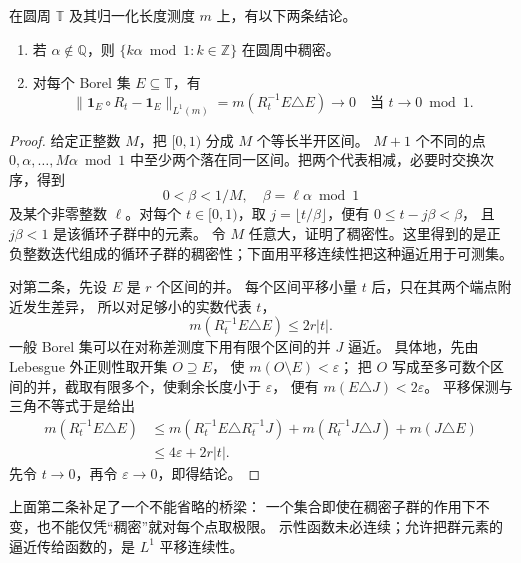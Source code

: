 \begin{lemma}[无理转动的稠密性与集合的平移连续性]
\label{b1:lem:rotation-density-continuity-32}
在圆周 \(\mathbb T\) 及其归一化长度测度 \(m\) 上，有以下两条结论。
\begin{enumerate}
\item\label{b1:item:rotation-dense-group-32}
若 \(\alpha\notin\mathbb Q\)，则
\(\{k\alpha\bmod1:k\in\mathbb Z\}\) 在圆周中稠密。
\item\label{b1:item:rotation-translation-32}
对每个 Borel 集 \(E\subseteq\mathbb T\)，有
\[
 \|\mathbf1_E\circ R_t-\mathbf1_E\|_{L^1(m)}
 =m(R_t^{-1}E\triangle E)\longrightarrow0
 \quad\text{当 }t\to0\bmod1.
\]
\end{enumerate}
\end{lemma}
\begin{proof}
给定正整数 \(M\)，把 \([0,1)\) 分成 \(M\) 个等长半开区间。
\(M+1\) 个不同的点 \(0,\alpha,\ldots,M\alpha\bmod1\)
中至少两个落在同一区间。把两个代表相减，必要时交换次序，得到
\[
 0<\beta<1/M,\quad \beta=\ell\alpha\bmod1
\]
及某个非零整数 \(\ell\)。对每个 \(t\in[0,1)\)，取
\(j=\lfloor t/\beta\rfloor\)，便有 \(0\leq t-j\beta<\beta\)，
且 \(j\beta<1\) 是该循环子群中的元素。
令 \(M\) 任意大，证明了稠密性。这里得到的是正负整数迭代组成的循环子群的稠密性；下面用平移连续性把这种逼近用于可测集。

对第二条，先设 \(E\) 是 \(r\) 个区间的并。
每个区间平移小量 \(t\) 后，只在其两个端点附近发生差异，
所以对足够小的实数代表 \(t\)，
\[
 m(R_t^{-1}E\triangle E)\leq2r|t|.
\]
一般 Borel 集可以在对称差测度下用有限个区间的并 \(J\) 逼近。
具体地，先由 Lebesgue 外正则性取开集 \(O\supseteq E\)，
使 \(m(O\setminus E)<\varepsilon\)；
把 \(O\) 写成至多可数个区间的并，截取有限多个，使剩余长度小于 \(\varepsilon\)，
便有 \(m(E\triangle J)<2\varepsilon\)。
平移保测与三角不等式于是给出
\[
 \begin{aligned}
 m(R_t^{-1}E\triangle E)
 &\leq m(R_t^{-1}E\triangle R_t^{-1}J)
       +m(R_t^{-1}J\triangle J)+m(J\triangle E)\\
 &\leq4\varepsilon+2r|t|.
 \end{aligned}
\]
先令 \(t\to0\)，再令 \(\varepsilon\to0\)，即得结论。
\end{proof}

上面第二条补足了一个不能省略的桥梁：
一个集合即使在稠密子群的作用下不变，也不能仅凭“稠密”就对每个点取极限。
示性函数未必连续；允许把群元素的逼近传给函数的，是 \(L^1\) 平移连续性。

